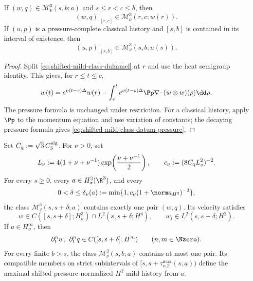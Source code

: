 \begin{lemma}
\label{lem:shifted-mild-restriction}
If \((w,q)\in\mathscr M_\nu^3(s,b;a)\) and
\(s\le r<c\le b\), then
\begin{equation}
 (w,q)|_{[r,c]}\in\mathscr M_\nu^3(r,c;w(r)).
 \label{eq:shifted-mild-restriction}
\end{equation}
If \((u,p)\) is a pressure-complete classical history and
\([s,b]\) is contained in its interval of existence, then
\begin{equation}
 (u,p)|_{[s,b]}\in\mathscr M_\nu^3(s,b;u(s)).
 \label{eq:classical-mild-admission}
\end{equation}
\end{lemma}

\begin{proof}
Split \eqref{eq:shifted-mild-class-duhamel} at \(r\) and use the heat
semigroup identity.  This gives, for \(r\le t\le c\),
\[
 w(t)=e^{\nu(t-r)\Delta}w(r)
 -\int_r^t e^{\nu(t-\rho)\Delta}
 \Pp\nabla\!\cdot(w\otimes w)(\rho)\dd\rho.
\]
The pressure formula is unchanged under restriction.  For a classical
history, apply \(\Pp\) to the momentum equation and use variation of
constants; the decaying pressure formula gives
\eqref{eq:shifted-mild-class-datum-pressure}.
\end{proof}

\begin{theorem}
\label{thm:local-restart}
Set \(C_{\rm q}:=\sqrt3\,C_3^{\rm alg}\).  For \(\nu>0\), set
\[
 L_\nu:=4(1+\nu+\nu^{-1})
 \exp\!\left(\frac{\nu+\nu^{-1}}2\right),
 \qquad
 c_\nu:=(8C_{\rm q}L_\nu^2)^{-2}.
\]
For every \(s\ge0\), every \(a\in H^3_\sigma(\R^3)\), and every
\[
 0<\delta\le\delta_\nu(a)
 :=\min\{1,c_\nu(1+\norm a_{H^3})^{-2}\},
\]
the class \(\mathscr M_\nu^3(s,s+\delta;a)\) contains exactly one pair
\((w,q)\).  Its velocity satisfies
\[
 w\in C([s,s+\delta];H^3_\sigma)
 \cap L^2(s,s+\delta;H^4),
 \qquad
 w_t\in L^2(s,s+\delta;H^2).
\]
If \(a\in H^\infty_\sigma\), then
\[
 \partial_t^nw,\ \partial_t^nq
 \in C([s,s+\delta];H^m)
 \qquad(n,m\in\Nzero).
\]
For every finite \(b>s\), the class
\(\mathscr M_\nu^3(s,b;a)\) contains at most one pair.  Its compatible members
on strict subintervals of
\([s,s+\tau_{\nu,3}^{\max}(s,a))\) define the maximal shifted
pressure-normalized \(H^3\) mild history from \(a\).
\end{theorem}

